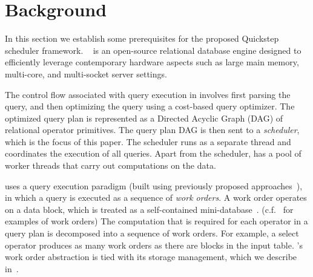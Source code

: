 \section{Background}\label{sec:background}
In this section we establish some prerequisites for the proposed Quickstep scheduler framework.
\sys{}~\cite{quickstep} is an open-source relational database engine 
designed to efficiently leverage contemporary hardware aspects such as large main memory, multi-core, and multi-socket server settings. 

The control flow associated with query execution in \sys{} involves first parsing the query, and then optimizing the query using a cost-based query optimizer.
The optimized query plan is represented as a Directed Acyclic Graph (DAG) of relational operator primitives. 
The query plan DAG is then sent to a \textit{scheduler}, which is the focus of this paper. 
The scheduler runs as a separate thread and coordinates the execution of all queries. 
Apart from the scheduler, \sys{} has a pool of worker threads that carry out computations on the data. 

\sys{} uses a query execution paradigm (built using previously proposed approaches~\cite{qsstorage,morsel}), in which a query is executed as a sequence of \textit{work orders}. 
A work order operates on a data block, which is treated as a self-contained mini-database~\cite{qsstorage}.  (c.f.~\cite{supplement} for examples of work orders)
The computation that is required for each operator in a query plan is decomposed into a sequence of work orders. 
For example, a select operator produces as many work orders as there are blocks in the input table. 
\sys{}'s work order abstraction is tied with its storage management, which we describe in~\cite{supplement}.
